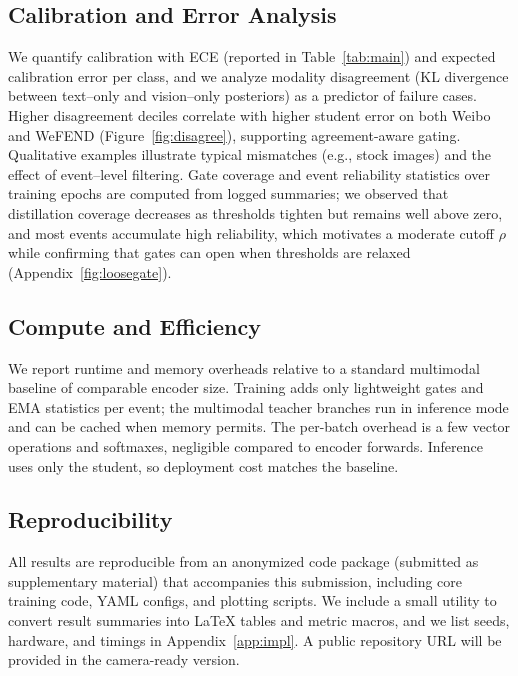 \subsection{Calibration and Error Analysis}
We quantify calibration with ECE (reported in Table~\ref{tab:main}) and expected calibration error per class, and we analyze modality disagreement (KL divergence between text–only and vision–only posteriors) as a predictor of failure cases. Higher disagreement deciles correlate with higher student error on both Weibo and WeFEND (Figure~\ref{fig:disagree}), supporting agreement-aware gating. Qualitative examples illustrate typical mismatches (e.g., stock images) and the effect of event–level filtering. Gate coverage and event reliability statistics over training epochs are computed from logged summaries; we observed that distillation coverage decreases as thresholds tighten but remains well above zero, and most events accumulate high reliability, which motivates a moderate cutoff $\rho$ while confirming that gates can open when thresholds are relaxed (Appendix~\ref{fig:loosegate}).

\subsection{Compute and Efficiency}
We report runtime and memory overheads relative to a standard multimodal baseline of comparable encoder size. Training adds only lightweight gates and EMA statistics per event; the multimodal teacher branches run in inference mode and can be cached when memory permits. The per-batch overhead is a few vector operations and softmaxes, negligible compared to encoder forwards. Inference uses only the student, so deployment cost matches the baseline.

\subsection{Reproducibility}
All results are reproducible from an anonymized code package (submitted as supplementary material) that accompanies this submission, including core training code, YAML configs, and plotting scripts. We include a small utility to convert result summaries into \LaTeX{} tables and metric macros, and we list seeds, hardware, and timings in Appendix~\ref{app:impl}. A public repository URL will be provided in the camera-ready version.
